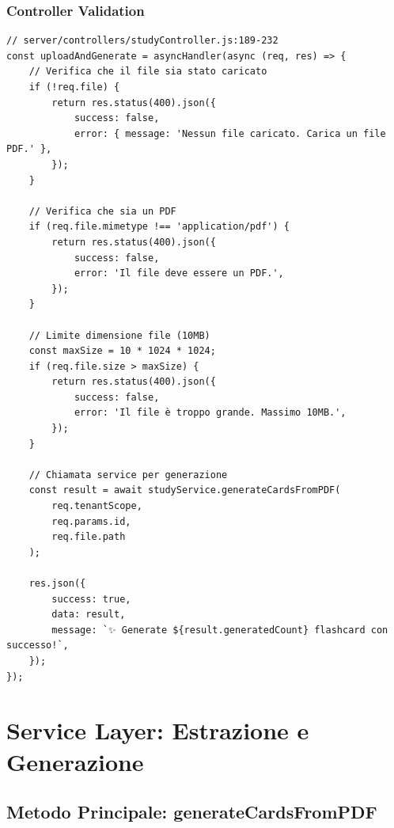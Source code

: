 \documentclass[11pt,a4paper]{article}
\begin{document}
\subsubsection{Controller Validation}

\begin{lstlisting}[caption=Controller - Validazione e Chiamata Service]
// server/controllers/studyController.js:189-232
const uploadAndGenerate = asyncHandler(async (req, res) => {
    // Verifica che il file sia stato caricato
    if (!req.file) {
        return res.status(400).json({
            success: false,
            error: { message: 'Nessun file caricato. Carica un file PDF.' },
        });
    }

    // Verifica che sia un PDF
    if (req.file.mimetype !== 'application/pdf') {
        return res.status(400).json({
            success: false,
            error: 'Il file deve essere un PDF.',
        });
    }

    // Limite dimensione file (10MB)
    const maxSize = 10 * 1024 * 1024;
    if (req.file.size > maxSize) {
        return res.status(400).json({
            success: false,
            error: 'Il file è troppo grande. Massimo 10MB.',
        });
    }

    // Chiamata service per generazione
    const result = await studyService.generateCardsFromPDF(
        req.tenantScope,
        req.params.id,
        req.file.path
    );

    res.json({
        success: true,
        data: result,
        message: `✨ Generate ${result.generatedCount} flashcard con successo!`,
    });
});
\end{lstlisting}

\section{Service Layer: Estrazione e Generazione}

\subsection{Metodo Principale: generateCardsFromPDF}
\end{document}
